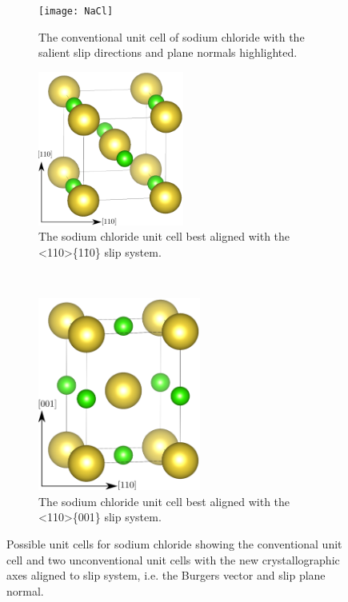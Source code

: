 \begin{figure}
\centering


    \begin{subfigure}{0.55\textwidth}
    \centering
    \texttt{[image: NaCl]}
    \caption{The conventional unit cell of sodium chloride with the salient slip directions and plane normals highlighted. \label{fig:NaCl_conventional_cell_slip_system_marked}}
    \end{subfigure}

    \begin{subfigure}{0.4\textwidth}
    \centering
    \includegraphics[height=2.0in]{NaCl_110_110_w_axes}
    \caption{The sodium chloride unit cell best aligned with the <110>\{1\={1}0\} slip system. \label{fig:NaCl_110_110_unit_cell}}
    \end{subfigure}
    ~
    \begin{subfigure}{0.4\textwidth}
    \centering
    \includegraphics[height=2.5in]{NaCl_110_001_w_axes}
    \caption{The sodium chloride unit cell best aligned with the <110>\{001\} slip system. \label{fig:NaCl_110_001_unit_cell}}
    \end{subfigure}

\caption{Possible unit cells for sodium chloride showing the conventional unit cell and two unconventional unit cells with the new crystallographic axes aligned to slip system, i.e. the Burgers vector and slip plane normal.\label{fig:unconventional_NaCl_unit_cells}}
\end{figure}







